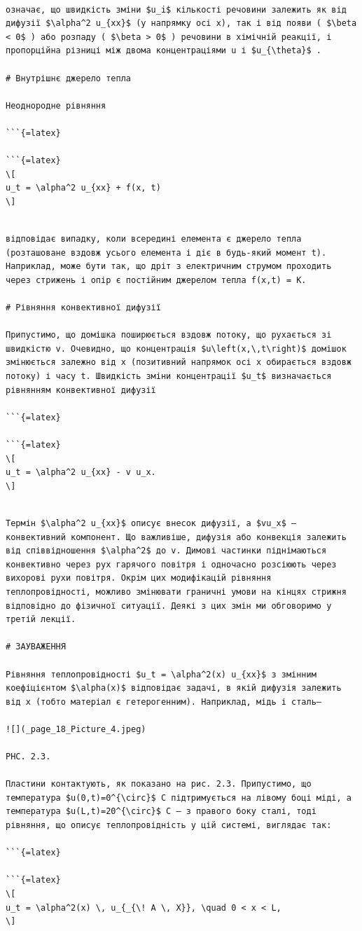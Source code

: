\documentclass[
  ukrainian,
]{article}
\begin{document}
\begin{verbatim}

означає, що швидкість зміни $u_i$ кількості речовини залежить як від дифузії $\alpha^2 u_{xx}$ (у напрямку осі x), так і від появи ( $\beta < 0$ ) або розпаду ( $\beta > 0$ ) речовини в хімічній реакції, і пропорційна різниці між двома концентраціями u і $u_{\theta}$ .

# Внутрішнє джерело тепла

Неоднородне рівняння

```{=latex}

```{=latex}
\[
u_t = \alpha^2 u_{xx} + f(x, t)
\]
\end{verbatim}

\begin{verbatim}

відповідає випадку, коли всередині елемента є джерело тепла (розташоване вздовж усього елемента і діє в будь-який момент t). Наприклад, може бути так, що дріт з електричним струмом проходить через стрижень і опір є постійним джерелом тепла f(x,t) = K.

# Рівняння конвективної дифузії

Припустимо, що домішка поширюється вздовж потоку, що рухається зі швидкістю v. Очевидно, що концентрація $u\left(x,\,t\right)$ домішок змінюється залежно від x (позитивний напрямок осі x обирається вздовж потоку) і часу t. Швидкість зміни концентрації $u_t$ визначається рівнянням конвективної дифузії

```{=latex}

```{=latex}
\[
u_t = \alpha^2 u_{xx} - v u_x.
\]
\end{verbatim}

\begin{verbatim}

Термін $\alpha^2 u_{xx}$ описує внесок дифузії, а $vu_x$ — конвективний компонент. Що важливіше, дифузія або конвекція залежить від співвідношення $\alpha^2$ до v. Димові частинки піднімаються конвективно через рух гарячого повітря і одночасно розсіюють через вихорові рухи повітря. Окрім цих модифікацій рівняння теплопровідності, можливо змінювати граничні умови на кінцях стрижня відповідно до фізичної ситуації. Деякі з цих змін ми обговоримо у третій лекції.

# ЗАУВАЖЕННЯ

Рівняння теплопровідності $u_t = \alpha^2(x) u_{xx}$ з змінним коефіцієнтом $\alpha(x)$ відповідає задачі, в якій дифузія залежить від x (тобто матеріал є гетерогенним). Наприклад, мідь і сталь—

![](_page_18_Picture_4.jpeg)

PHC. 2.3.

Пластини контактують, як показано на рис. 2.3. Припустимо, що температура $u(0,t)=0^{\circ}$ C підтримується на лівому боці міді, а температура $u(L,t)=20^{\circ}$ C — з правого боку сталі, тоді рівняння, що описує теплопровідність у цій системі, виглядає так:

```{=latex}

```{=latex}
\[
u_t = \alpha^2(x) \, u_{_{\! A \, X}}, \quad 0 < x < L,
\]
\end{verbatim}
\end{document}
